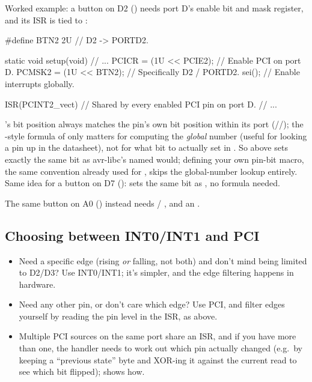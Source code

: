 Worked example: a button on D2 () needs port D's enable bit and mask register, and its
ISR is tied to :

\begin{ccode}
#define BTN2 2U // D2 -> PORTD2.

static void setup(void)
{
    // ...
    PCICR = (1U << PCIE2);  // Enable PCI on port D.
    PCMSK2 = (1U << BTN2);  // Specifically D2 / PORTD2.
    sei();                  // Enable interrupts globally.
}

ISR(PCINT2_vect) // Shared by every enabled PCI pin on port D.
{
    // ...
}
\end{ccode}

's bit position always matches the pin's own bit position within its port
(//); the -style formula of
 only matters for computing the \emph{global}  number (useful for
looking a pin up in the datasheet), not for what bit to actually set in . So
 above sets exactly the same bit as avr-libc's named
 would; defining your own pin-bit macro, the same convention
 already used for , skips the global-number lookup entirely. Same idea
for a button on D7 ():  sets the same bit as
, no formula needed.

The same button on A0 () instead needs  / , and an
.

\subsection{Choosing between INT0/INT1 and PCI}
\label{c3:a:7}
\begin{itemize}
  \item Need a specific edge (rising \emph{or} falling, not both) and don't mind being limited to
    D2/D3? Use INT0/INT1; it's simpler, and the edge filtering happens in hardware.
  \item Need any other pin, or don't care which edge? Use PCI, and filter edges yourself by reading
    the pin level in the ISR, as above.
  \item Multiple PCI sources on the same port share an ISR, and if you have more than one, the
    handler needs to work out which pin actually changed (e.g.\ by keeping a ``previous state''
    byte and XOR-ing it against the current  read to see which bit flipped);
     shows how.
\end{itemize}

